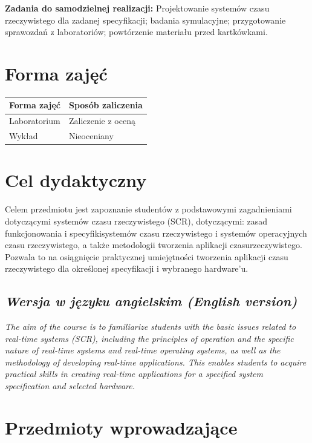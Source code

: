 \documentclass[12pt, a4paper]{article}
\begin{document}
\vspace{4pt}
\noindent\textbf{Zadania do samodzielnej realizacji:} Projektowanie systemów czasu rzeczywistego dla zadanej specyfikacji; badania symulacyjne; przygotowanie sprawozdań z laboratoriów; powtórzenie materiału przed kartkówkami.

\section{Forma zajęć}

\begin{tabular}{ll}
  \hline
  \textbf{Forma zajęć} & \textbf{Sposób zaliczenia} \\
  \hline
  Laboratorium & Zaliczenie z oceną \\
  Wykład & Nieoceniany \\
  \hline
\end{tabular}

\section{Cel dydaktyczny}

Celem przedmiotu jest zapoznanie studentów z podstawowymi zagadnieniami dotyczącymi systemów czasu rzeczywistego (SCR), dotyczącymi: zasad funkcjonowania i specyfikisystemów czasu rzeczywistego i systemów operacyjnych czasu rzeczywistego, a także metodologii tworzenia aplikacji czasurzeczywistego. Pozwala to na osiągnięcie praktycznej umiejętności tworzenia aplikacji czasu rzeczywistego dla określonej specyfikacji i wybranego hardware’u.

\subsection*{\textit{Wersja w języku angielskim (English version)}}

\textit{The aim of the course is to familiarize students with the basic issues related to real-time systems (SCR), including the principles of operation and the specific nature of real-time systems and real-time operating systems, as well as the methodology of developing real-time applications. This enables students to acquire practical skills in creating real-time applications for a specified system specification and selected hardware.}


\section{Przedmioty wprowadzające}
\end{document}
